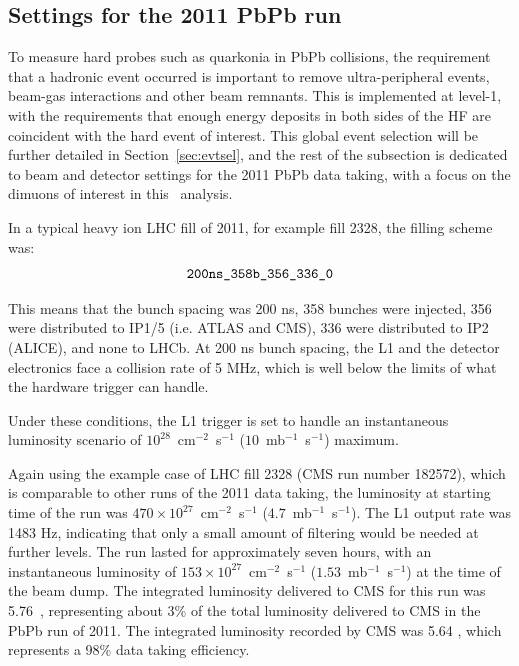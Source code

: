 \subsection{Settings for the 2011 PbPb run}
\label{sec:HiRates}

To measure hard probes such as quarkonia in PbPb collisions, the requirement that a hadronic event occurred is
important to remove ultra-peripheral events, beam-gas interactions and
other beam remnants. This is implemented at level-1, with the
requirements that enough energy deposits in both sides of the HF are coincident with the hard
event of interest. This global event selection will be further
detailed in Section~\ref{sec:evtsel}, and the rest of the subsection
is dedicated to beam and detector settings for the 2011 PbPb data
taking, with a focus on the dimuons of interest in this \PgU\ analysis.


In a typical heavy ion LHC fill of 2011, for example fill 2328, the filling scheme was:
\begin{equation*}
  \verb?200ns_358b_356_336_0?
\end{equation*}

This means that the bunch spacing was 200 ns, 358 bunches were
injected, 356 were distributed to IP1/5 (i.e. ATLAS and CMS), 336 were
distributed to IP2 (ALICE), and none to LHCb.
At 200 ns bunch spacing, the L1 and the detector electronics face a
collision rate of 5 MHz, which is well below the limits of what the
hardware trigger can handle. 

Under these conditions, the L1 trigger is set to handle an
instantaneous luminosity scenario of $10^{28}$~cm$^{-2}$~s$^{-1}$
($10$~mb$^{-1}$~s$^{-1}$) maximum.

Again using the example case of LHC fill 2328 (CMS run number 182572),
which is comparable to other runs of the 2011 data taking,
the luminosity at starting time of the run was $470\times 10^{27}$~cm$^{-2}$~s$^{-1}$
($4.7$~mb$^{-1}$~s$^{-1}$). The L1 output rate was 1483 Hz, indicating
that only a small amount of filtering would be needed at further
levels. The run lasted for approximately seven hours, with an
instantaneous luminosity of $153\times 10^{27}$~cm$^{-2}$~s$^{-1}$
($1.53$~mb$^{-1}$~s$^{-1}$) at the time of the beam dump. The
integrated luminosity delivered to CMS for this run was 5.76~\invmub,
representing about 3\% of the total luminosity delivered to CMS in the
PbPb run of 2011. The integrated luminosity recorded by CMS was 5.64
\invmub, which represents a 98\% data taking efficiency.  %



